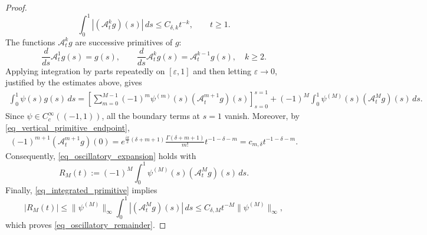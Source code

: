 \documentclass[12pt]{amsart}
\newtheorem{remark}[theorem]{Remark}
\begin{document}
\begin{proof}
\begin{equation}
    \int_0^1 |(\mathcal A_t^k g)(s)|\,ds
    \leq C_{\delta,k}t^{-k},
    \qquad t\geq1.
\end{equation}
The functions $\mathcal A_t^k g$ are successive primitives of $g$:
\begin{equation*}
    \frac{d}{ds}\mathcal A_t^1g(s)=g(s),
    \qquad
    \frac{d}{ds}\mathcal A_t^kg(s)
    =\mathcal A_t^{k-1}g(s),
    \quad k\geq2.
\end{equation*}
Applying integration by parts repeatedly on $[\varepsilon,1]$ and
then letting $\varepsilon\to 0$, justified by the estimates
above, gives
\begin{align*}
    \int_0^1\psi(s)g(s)\,ds =
    \left[
        \sum_{m=0}^{M-1}
        (-1)^m\psi^{(m)}(s)
        (\mathcal A_t^{m+1}g)(s)
    \right]_{s=0}^{s=1} + (-1)^M
    \int_0^1
    \psi^{(M)}(s)(\mathcal A_t^Mg)(s)\,ds .
\end{align*}
Since $\psi\in C_c^\infty((-1,1))$, all the boundary terms at
$s=1$ vanish. Moreover, by
\eqref{eq_vertical_primitive_endpoint},
\begin{align*}
    (-1)^{m+1}(\mathcal A_t^{m+1}g)(0) =
    e^{\frac{i\pi}{2}(\delta+m+1)}
    \frac{\Gamma(\delta+m+1)}{m!}
    t^{-1-\delta-m} =c_{m,\delta}t^{-1-\delta-m}.
\end{align*}
Consequently, \eqref{eq_oscillatory_expansion} holds with
\begin{equation*}
    R_M(t)
    :=
    (-1)^M
    \int_0^1
    \psi^{(M)}(s)(\mathcal A_t^Mg)(s)\,ds.
\end{equation*}
Finally, \eqref{eq_integrated_primitive} implies
\begin{equation*}
    |R_M(t)|
    \leq
    \|\psi^{(M)}\|_\infty
    \int_0^1|(\mathcal A_t^Mg)(s)|\,ds
    \leq
    C_{\delta,M}t^{-M}\|\psi^{(M)}\|_\infty,
\end{equation*}
which proves \eqref{eq_oscillatory_remainder}.
\end{proof}

\end{document}
